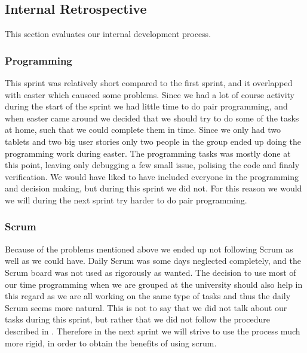 \subsection{Internal Retrospective}\label{internal2}
This section evaluates our internal development process.

\subsubsection{Programming}
This sprint was relatively short compared to the first sprint, and it overlapped with easter which causeed some problems. 
Since we had a lot of course activity during the start of the sprint we had little time to do pair programming, and when easter came around we decided that we should try to do some of the tasks at home, such that we could complete them in time. 
Since we only had two tablets and two big user stories only two people in the group ended up doing the programming work during easter.
The programming tasks was mostly done at this point, leaving only debugging a few small issue, polising the code and finaly verification.
We would have liked to have included everyone in the programming and decision making, but during this sprint we did not.
For this reason we would we will during the next sprint try harder to do pair programming.

\subsubsection{Scrum}
Because of the problems mentioned above we ended up not following Scrum as well as we could have.
Daily Scrum was some days neglected completely, and the Scrum board was not used as rigorously as wanted.
The decision to use most of our time programming when we are grouped at the university should also help in this regard as we are all working on the same type of tasks and thus the daily Scrum seems more natural.
This is not to say that we did not talk about our tasks during this sprint, but rather that we did not follow the procedure described in .
Therefore in the next sprint we will strive to use the process much more rigid, in order to obtain the benefits of using scrum.
